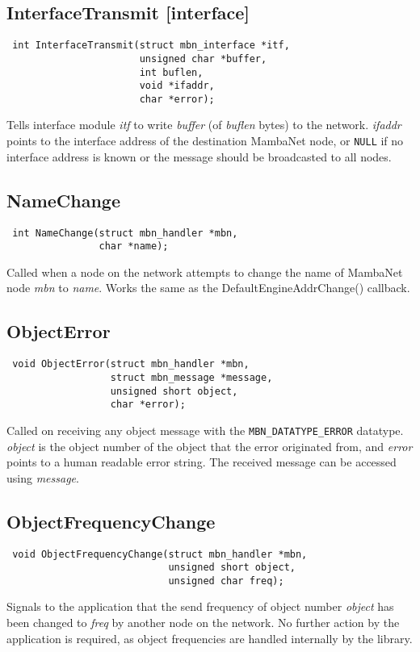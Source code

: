\subsection{InterfaceTransmit \footnotesize{[interface]}}
\begin{verbatim}
 int InterfaceTransmit(struct mbn_interface *itf,
                       unsigned char *buffer,
                       int buflen,
                       void *ifaddr,
                       char *error);
\end{verbatim}
Tells interface module \textit{itf} to write \textit{buffer} (of \textit{buflen} bytes) to the network. \textit{ifaddr} points to the interface address of the destination MambaNet node, or \verb|NULL| if no interface address is known or the message should be broadcasted to all nodes.


\subsection{NameChange}
\begin{verbatim}
 int NameChange(struct mbn_handler *mbn,
                char *name);
\end{verbatim}
Called when a node on the network attempts to change the name of MambaNet node \textit{mbn} to \textit{name}. Works the same as the DefaultEngineAddrChange() callback.


\subsection{ObjectError}
\begin{verbatim}
 void ObjectError(struct mbn_handler *mbn,
                  struct mbn_message *message,
                  unsigned short object,
                  char *error);
\end{verbatim}
Called on receiving any object message with the \verb|MBN_DATATYPE_ERROR| datatype. \textit{object} is the object number of the object that the error originated from, and \textit{error} points to a human readable error string. The received message can be accessed using \textit{message}.


\subsection{ObjectFrequencyChange}
\begin{verbatim}
 void ObjectFrequencyChange(struct mbn_handler *mbn,
                            unsigned short object,
                            unsigned char freq);
\end{verbatim}
Signals to the application that the send frequency of object number \textit{object} has been changed to \textit{freq} by another node on the network. No further action by the application is required, as object frequencies are handled internally by the library.


